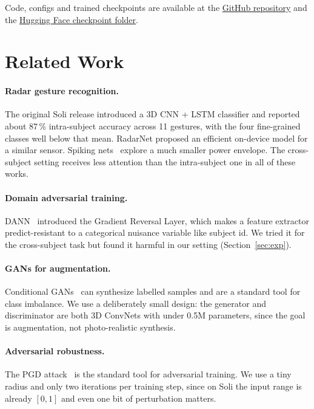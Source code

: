 \documentclass[10pt,twocolumn,letterpaper]{article}
\begin{document}
Code, configs and trained checkpoints are available at the
\href{https://github.com/bhukyavenkatamahesh/assignment3}{GitHub repository}
and the
\href{https://huggingface.co/venkatamahesh/advsoli-soli/tree/main/checkpoints}{Hugging Face checkpoint folder}.

\section{Related Work}
\label{sec:related}

\paragraph{Radar gesture recognition.} The original Soli release
\cite{wang2016interacting} introduced a 3D CNN + LSTM classifier and
reported about 87\,\% intra-subject accuracy across 11 gestures, with
the four fine-grained classes well below that mean. RadarNet
\cite{hayashi2021radarnet} proposed an efficient on-device model for a
similar sensor. Spiking nets~\cite{tsang2021spiking} explore a much
smaller power envelope. The cross-subject setting receives less
attention than the intra-subject one in all of these works.

\paragraph{Domain adversarial training.} DANN~\cite{ganin2015dann}
introduced the Gradient Reversal Layer, which makes a feature extractor
predict-resistant to a categorical nuisance variable like subject id. We
tried it for the cross-subject task but found it harmful in our setting
(Section~\ref{sec:exp}).

\paragraph{GANs for augmentation.} Conditional GANs~\cite{mirza2014cgan,
goodfellow2014gan} can synthesize labelled samples and are a standard
tool for class imbalance. We use a deliberately small design: the
generator and discriminator are both 3D ConvNets with under 0.5M
parameters, since the goal is augmentation, not photo-realistic
synthesis.

\paragraph{Adversarial robustness.} The PGD attack~\cite{madry2018towards}
is the standard tool for adversarial training. We use a tiny radius and
only two iterations per training step, since on Soli the input range is
already $[0,1]$ and even one bit of perturbation matters.
\end{document}
